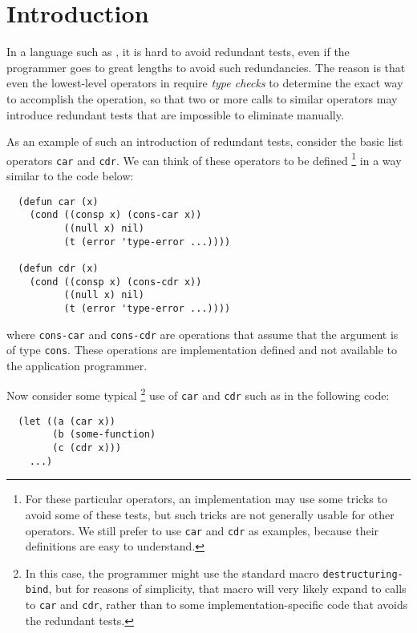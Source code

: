 \section{Introduction}
\label{sec-introduction}

In a language such as \commonlisp{} \cite{ansi:common:lisp}, it is
hard to avoid redundant tests, even if the programmer goes to great
lengths to avoid such redundancies.  The reason is that even the
lowest-level operators in \commonlisp{} require \emph{type checks} to
determine the exact way to accomplish the operation, so that two or
more calls to similar operators may introduce redundant tests that are
impossible to eliminate manually.

As an example of such an introduction of redundant tests, consider the
basic list operators \texttt{car} and \texttt{cdr}.  We can think of
these operators to be defined%
\footnote{For these particular operators, an implementation may use
  some tricks to avoid some of these tests, but such tricks are not
  generally usable for other operators.  We still prefer to use
  \texttt{car} and \texttt{cdr} as examples, because their definitions
  are easy to understand.}
in a way similar to the code below:

\begin{verbatim}
  (defun car (x)
    (cond ((consp x) (cons-car x))
          ((null x) nil)
          (t (error 'type-error ...))))

  (defun cdr (x)
    (cond ((consp x) (cons-cdr x))
          ((null x) nil)
          (t (error 'type-error ...))))
\end{verbatim}

\noindent
where \texttt{cons-car} and \texttt{cons-cdr} are operations that
assume that the argument is of type \texttt{cons}.  These operations
are implementation defined and not available to the application
programmer.

Now consider some typical%
\footnote{In this case, the programmer might use the standard macro
  \texttt{destructuring-bind}, but for reasons of simplicity, that
  macro will very likely expand to calls to \texttt{car} and
  \texttt{cdr}, rather than to some implementation-specific code that
  avoids the redundant tests.}
use of \texttt{car} and \texttt{cdr} such as
in the following code:

\begin{verbatim}
  (let ((a (car x))
        (b (some-function)
        (c (cdr x)))
    ...)
\end{verbatim}

